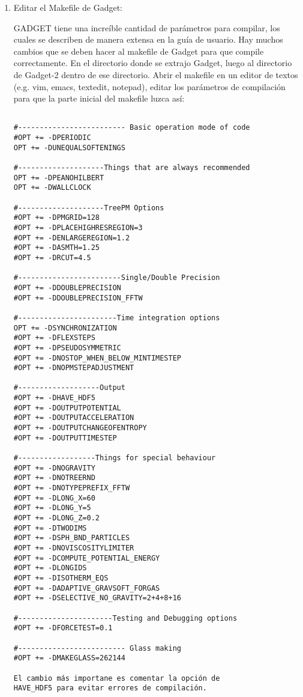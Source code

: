 \documentclass[a4paper,openright,12pt]{book}
\begin{document}
\begin{enumerate}
\item Editar el \textsf{Makefile} de Gadget:

GADGET tiene una increíble cantidad de parámetros para compilar, los cuales se describen de manera extensa en la guía de usuario. Hay muchos cambios que se deben hacer al \textsf{makefile} de Gadget para que compile correctamente.  En el directorio donde se extrajo Gadget, luego al directorio de \textsf{Gadget-2} dentro de ese directorio. Abrir el \textsf{makefile} en un editor de textos (e.g. \textsf{vim, emacs, textedit, notepad}), editar los parámetros de compilación para que la parte inicial del \textsf{makefile} luzca así:
\begin{verbatim}

#------------------------- Basic operation mode of code
#OPT += -DPERIODIC
OPT += -DUNEQUALSOFTENINGS

#--------------------Things that are always recommended
OPT += -DPEANOHILBERT
OPT += -DWALLCLOCK

#--------------------TreePM Options
#OPT += -DPMGRID=128
#OPT += -DPLACEHIGHRESREGION=3
#OPT += -DENLARGEREGION=1.2
#OPT += -DASMTH=1.25
#OPT += -DRCUT=4.5

#------------------------Single/Double Precision
#OPT += -DDOUBLEPRECISION
#OPT += -DDOUBLEPRECISION_FFTW

#-----------------------Time integration options
OPT += -DSYNCHRONIZATION
#OPT += -DFLEXSTEPS
#OPT += -DPSEUDOSYMMETRIC
#OPT += -DNOSTOP_WHEN_BELOW_MINTIMESTEP
#OPT += -DNOPMSTEPADJUSTMENT

#-------------------Output
#OPT += -DHAVE_HDF5
#OPT += -DOUTPUTPOTENTIAL
#OPT += -DOUTPUTACCELERATION
#OPT += -DOUTPUTCHANGEOFENTROPY
#OPT += -DOUTPUTTIMESTEP

#------------------Things for special behaviour
#OPT += -DNOGRAVITY
#OPT += -DNOTREERND
#OPT += -DNOTYPEPREFIX_FFTW
#OPT += -DLONG_X=60
#OPT += -DLONG_Y=5
#OPT += -DLONG_Z=0.2
#OPT += -DTWODIMS
#OPT += -DSPH_BND_PARTICLES
#OPT += -DNOVISCOSITYLIMITER
#OPT += -DCOMPUTE_POTENTIAL_ENERGY
#OPT += -DLONGIDS
#OPT += -DISOTHERM_EQS
#OPT += -DADAPTIVE_GRAVSOFT_FORGAS
#OPT += -DSELECTIVE_NO_GRAVITY=2+4+8+16

#----------------------Testing and Debugging options
#OPT += -DFORCETEST=0.1

#------------------------- Glass making
#OPT += -DMAKEGLASS=262144

El cambio más importane es comentar la opción de
HAVE_HDF5 para evitar errores de compilación.


\end{verbatim}
\end{enumerate}
\end{document}
